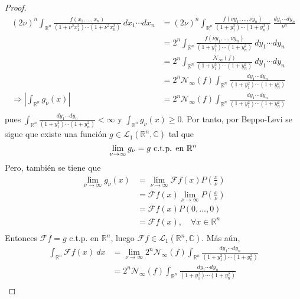 \documentclass[12pt]{report}
\newcounter{it}
\theoremstyle{largebreak}
\renewcommand{\geq}{\ensuremath{\geqslant}}
\newcommand\abs[1]{\ensuremath{\left|#1\right|}}
\newcommand{\N}[2]{\ensuremath{\mathcal{N}_{#1}\left(#2\right)}}
\newcommand{\fou}[1]{\ensuremath{\mathcal{F}#1}}
\begin{document}
\begin{proof}
        \begin{equation*}
            \begin{split}
                (2\nu)^n\int_{\mathbb{R}^n}\frac{f(x_1,...,x_n)}{(1+\nu^2x_1^2)\cdots(1+\nu^2x_n^2)}\:dx_1\cdots dx_n&=(2\nu)^n\int_{\mathbb{R}^n}\frac{f(\nu y_1,...,\nu y_n)}{(1+y_1^2)\cdots(1+y_n^2)}\: \frac{dy_1\cdots dy_n}{\nu^n}\\
                &=2^n\int_{\mathbb{R}^n}\frac{f(\nu y_1,...,\nu y_n)}{(1+y_1^2)\cdots(1+y_n^2)}\:dy_1\cdots dy_n\\
                &=2^n\int_{\mathbb{R}^n}\frac{\N{\infty}{f}}{(1+y_1^2)\cdots(1+y_n^2)}\:dy_1\cdots dy_n\\
                &=2^n\N{\infty}{f}\int_{\mathbb{R}^n}\frac{dy_1\cdots dy_n}{(1+y_1^2)\cdots(1+y_n^2)}\\
                \Rightarrow \abs{\int_{\mathbb{R}^n}g_\nu(x)}&=2^n\N{\infty}{f}\int_{\mathbb{R}^n}\frac{dy_1\cdots dy_n}{(1+y_1^2)\cdots(1+y_n^2)}\\
            \end{split}
        \end{equation*}
        pues $\int_{\mathbb{R}^n}\frac{dy_1\cdots dy_n}{(1+y_1^2)\cdots(1+y_n^2)}<\infty$ y $\int_{\mathbb{R}^n}g_\nu(x)\geq0$. Por tanto, por Beppo-Levi se sigue que existe una función $g\in\mathcal{L}_1(\mathbb{R}^n,\mathbb{C})$ tal que
        \begin{equation*}
            \lim_{\nu\rightarrow\infty}g_\nu=g\textup{ c.t.p. en }\mathbb{R}^n
        \end{equation*}
        Pero, también se tiene que
        \begin{equation*}
            \begin{split}
                \lim_{\nu\rightarrow\infty}g_\nu(x)&=\lim_{\nu\rightarrow\infty}\fou{f}(x)P\left(\frac{x}{\nu}\right)\\
                &=\fou{f}(x)\lim_{\nu\rightarrow\infty}P\left(\frac{x}{\nu}\right)\\
                &=\fou{f}(x)P\left(0,...,0\right)\\
                &=\fou{f}(x),\quad\forall x\in\mathbb{R}^n \\
            \end{split}
        \end{equation*}
        Entonces $\fou{f}=g$ c.t.p. en $\mathbb{R}^n$, luego $\fou{f}\in\mathcal{L}_1(\mathbb{R}^n,\mathbb{C})$. Más aún,
        \begin{equation*}
            \begin{split}
                \int_{\mathbb{R}^n}\fou{f}(x)\:dx&=\lim_{\nu\rightarrow\infty}2^n\N{\infty}{f}\int_{\mathbb{R}^n}\frac{dy_1\cdots dy_n}{(1+y_1^2)\cdots(1+y_n^2)}\\
                &=2^n\N{\infty}{f}\int_{\mathbb{R}^n}\frac{dy_1\cdots dy_n}{(1+y_1^2)\cdots(1+y_n^2)}\\
            \end{split}
        \end{equation*}
    \end{proof}
\end{document}
